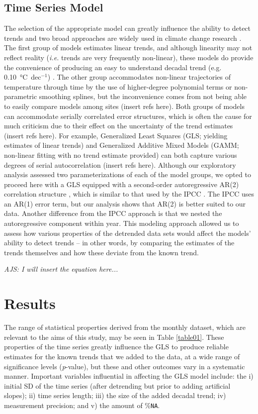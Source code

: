 \documentclass[]{ametsoc}
\begin{document}
\subsection{Time Series Model}
The selection of the appropriate model can greatly influence the ability to detect trends \citet{Franzke2012} and two broad approaches are widely used in climate change research \citep{IPCC2013}. The first group of models estimates linear trends, and although linearity may not reflect reality (\emph{i.e.} trends are very frequently non-linear), these models do provide the convenience of producing an easy to understand decadal trend (e.g. \SI{0.10}{\degreeCelsius}~dec$^{-1}$) \citep{Wilks2006}. The other group accommodates non-linear trajectories of temperature through time by the use of higher-degree polynomial terms or non-parametric smoothing splines, but the inconvenience comes from not being able to easily compare models among sites (insert refs here). Both groups of models can accommodate serially correlated error structures, which is often the cause for much criticism due to their effect on the uncertainty of the trend estimates (insert refs here). For example, Generalized Least Squares (GLS; yielding estimates of linear trends) and Generalized Additive Mixed Models (GAMM; non-linear fitting with no trend estimate provided) can both capture various degrees of serial autocorrelation (insert refs here). Although our exploratory analysis assessed two parameterizations of each of the model groups, we opted to proceed here with a GLS equipped with a second-order autoregressive AR(2) correlation structure \citep{Wood2006}, which is similar to that used by the IPCC \citep{IPCC2013}. The IPCC uses an AR(1) error term, but our analysis shows that AR(2) is better suited to our data. Another difference from the IPCC approach is that we nested the autoregressive component within year. This modeling approach allowed us to assess how various properties of the detrended data sets would affect the models' ability to detect trends -- in other words, by comparing the estimates of the trends themselves and how these deviate from the known trend.

\emph{AJS: I will insert the equation here...}

\section{Results}
The range of statistical properties derived from the monthly dataset, which are relevant to the aims of this study, may be seen in Table \ref{table01}. These properties of the time series greatly influence the GLS to produce reliable estimates for the known trends that we added to the data, at a wide range of significance levels (\emph{p}-value), but these and other outcomes vary in a systematic manner. Important variables influential in affecting the GLS model include: the i) initial SD of the time series (after detrending but prior to adding artificial slopes); ii) time series length; iii) the size of the added decadal trend; iv) measurement precision; and v) the amount of \%\texttt{NA}.
\end{document}
